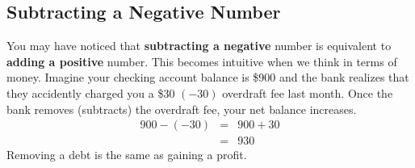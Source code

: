\documentclass{ximera}[font=12pt]
\begin{document}
\begin{problem}
\begin{problem}
\begin{center}
\end{center}


\end{problem}
\end{problem}

\subsection*{Subtracting a Negative Number}

You may have noticed that \textbf{subtracting a negative} number is equivalent to \textbf{adding a positive} number.  This becomes intuitive when we think in terms of money.  Imagine your checking account balance is \$900 and the bank realizes that they accidently charged you a \$30 $(-30)$ overdraft fee last month.  Once the bank removes (subtracts) the overdraft fee, your net balance increases.
\begin{eqnarray*}
900-(-30) &=& 900 + 30 \\
          &=& 930
\end{eqnarray*}
Removing a debt is the same as gaining a profit.
\end{document}
